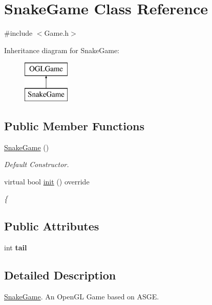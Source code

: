 \hypertarget{class_snake_game}{}\section{Snake\+Game Class Reference}
\label{class_snake_game}


{\ttfamily \#include $<$Game.\+h$>$}

Inheritance diagram for Snake\+Game\+:\begin{figure}[H]
\begin{center}
\leavevmode
\includegraphics[height=2.000000cm]{class_snake_game}
\end{center}
\end{figure}
\subsection*{Public Member Functions}
\begin{DoxyCompactItemize}
\item 
\hyperlink{class_snake_game_a2a1202d9c2dc3b420e894b7f1581c3a6}{Snake\+Game} ()
\begin{DoxyCompactList}\small\item\em Default Constructor. \end{DoxyCompactList}\item 
virtual bool \hyperlink{class_snake_game_adf792bb503c35e536d905bca53086bbb}{init} () override
\begin{DoxyCompactList}\small\item\em \{ \end{DoxyCompactList}\end{DoxyCompactItemize}
\subsection*{Public Attributes}
\begin{DoxyCompactItemize}
\item 
\mbox{\label{class_snake_game_aee5d3cac6bbb0a9b8e6d04fd7d68a7d5}} 
int {\bfseries tail}
\end{DoxyCompactItemize}


\subsection{Detailed Description}
\hyperlink{class_snake_game}{Snake\+Game}. An Open\+GL Game based on A\+S\+GE. 

